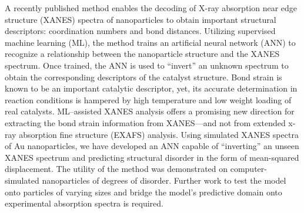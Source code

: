 


A recently published method \cite{Timoshenko2017} enables the decoding of X-ray absorption near edge structure (XANES) spectra of nanoparticles to obtain important structural descriptors: coordination numbers and bond distances. Utilizing supervised machine learning (ML), the method trains an artificial neural network (ANN) to recognize a relationship between the nanoparticle structure and the XANES spectrum. Once trained, the ANN is used to ``invert'' an unknown spectrum to obtain the corresponding descriptors of the catalyst structure. Bond strain is known to be an important catalytic descriptor, yet, its accurate determination in reaction conditions is hampered by high temperature and low weight loading of real catalysts. ML–assisted XANES analysis offers a promising new direction for extracting the bond strain information from XANES---and not from extended x-ray absorption fine structure (EXAFS) analysis. Using simulated XANES spectra of Au nanoparticles, we have developed an ANN capable of ``inverting'' an unseen XANES spectrum and predicting structural disorder in the form of mean-squared displacement. The utility of the method was demonstrated on computer-simulated nanoparticles of degrees of disorder. Further work to test the model onto particles of varying sizes and bridge the model's predictive domain onto experimental absorption spectra is required.


